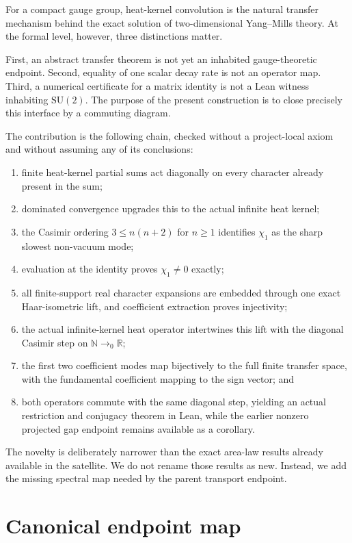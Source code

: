 \documentclass[11pt]{article}
\theoremstyle{definition}
\theoremstyle{remark}
\newcommand{\SU}{\mathrm{SU}(2)}
\begin{document}
For a compact gauge group, heat-kernel convolution is the natural transfer
mechanism behind the exact solution of two-dimensional Yang--Mills theory.
At the formal level, however, three distinctions matter.

First, an abstract transfer theorem is not yet an inhabited gauge-theoretic
endpoint.  Second, equality of one scalar decay rate is not an operator map.
Third, a numerical
certificate for a matrix identity is not a Lean witness inhabiting $\SU$.
The purpose of the present construction is to close precisely this interface
by a commuting diagram.

The contribution is the following chain, checked without a project-local
axiom and without assuming any of its conclusions:
\begin{enumerate}[label=(\roman*)]
\item finite heat-kernel partial sums act diagonally on every character already
  present in the sum;
\item dominated convergence upgrades this to the actual infinite heat kernel;
\item the Casimir ordering $3\le n(n+2)$ for $n\ge1$ identifies $\chi_1$ as the
  sharp slowest non-vacuum mode;
\item evaluation at the identity proves $\chi_1\ne0$ exactly;
\item all finite-support real character expansions are embedded through one
  exact Haar-isometric lift, and coefficient extraction proves injectivity;
\item the actual infinite-kernel heat operator intertwines this lift with the
  diagonal Casimir step on $\mathbb N\to_0\mathbb R$;
\item the first two coefficient modes map bijectively to the full finite transfer
  space, with the fundamental coefficient mapping to the sign vector; and
\item both operators commute with the same diagonal step, yielding an actual
  restriction and conjugacy theorem in Lean, while the earlier nonzero projected
  gap endpoint remains available as a corollary.
\end{enumerate}

The novelty is deliberately narrower than the exact area-law results already
available in the satellite.  We do not rename those results as new.  Instead,
we add the missing spectral map needed by the parent transport endpoint.

\section{Canonical endpoint map}
\end{document}
